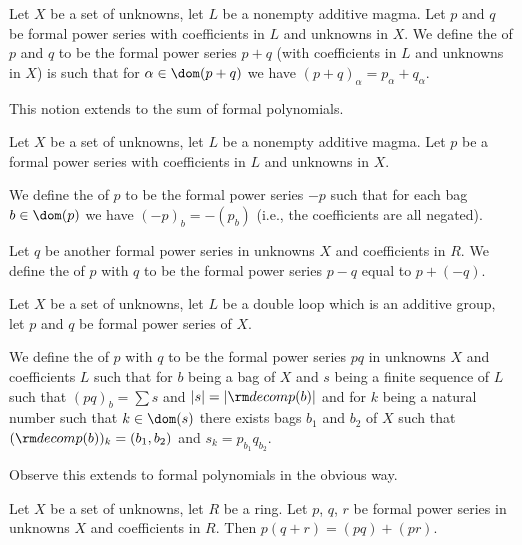 \begin{definition}
Let $X$ be a set of unknowns, let $L$ be a nonempty additive magma.
Let $p$ and $q$ be formal power series with coefficients in $L$ and
unknowns in $X$.
We define the  of $p$ and $q$ to be the formal power
series $p+q$ (with coefficients in $L$ and unknowns in $X$) is such
that %
for $\alpha\in\dom(p+q)$ we
have $(p+q)_{\alpha} = p_{\alpha} + q_{\alpha}$.

This notion extends to the sum of formal polynomials.
\end{definition}

\begin{definition}
Let $X$ be a set of unknowns, let $L$ be a nonempty additive magma.
Let $p$ be a formal power series with coefficients in $L$ and
unknowns in $X$.

We define the  of $p$ to be the formal power series $-p$ such that for each bag
$b\in\dom(p)$ we have $(-p)_{b}=-(p_{b})$ (i.e., the coefficients are
all negated).

Let $q$ be another formal power series in unknowns $X$ and
coefficients in $R$.
We define the  of $p$ with $q$ to be the formal
power series $p - q$ equal to $p + (-q)$.
\end{definition}

\begin{definition}
Let $X$ be a set of unknowns, let $L$ be a double loop which is an
additive group, let $p$ and $q$ be formal power series
of $X$.

We define the  of $p$ with $q$ to be the
formal power series $pq$ in unknowns $X$ and coefficients $L$ such
that for $b$ being a bag of $X$ and $s$ being a finite sequence of $L$
such that $(pq)_{b}=\sum s$ and $|s|=|{\rm decomp}(b)|$ and for $k$
being a natural number such that $k\in\dom(s)$ there exists bags
$b_{1}$ and $b_{2}$ of $X$ such that
$({\rm decomp}(b))_{k}=(b_{1},b_{2})$ and $s_{k}=p_{b_{1}}q_{b_{2}}$.

Observe this extends to formal polynomials in the obvious way.
\end{definition}

\begin{theorem}
Let $X$ be a set of unknowns, let $R$ be a ring. Let $p$, $q$, $r$ be
formal power series in unknowns $X$ and coefficients in $R$. Then
$p(q+r)=(pq) + (pr)$.
\end{theorem}

